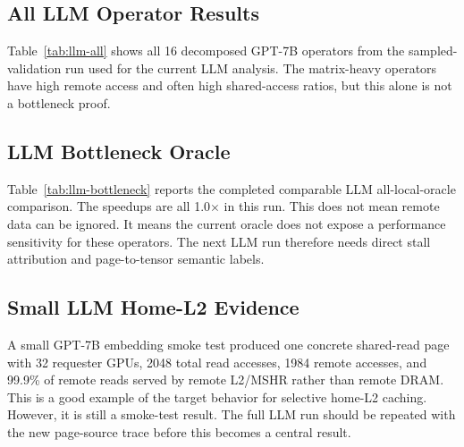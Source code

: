 \documentclass[sigconf,screen,review,anonymous]{acmart}
\begin{document}
\subsection{All LLM Operator Results}

Table~\ref{tab:llm-all} shows all 16 decomposed GPT-7B operators from the
sampled-validation run used for the current LLM analysis.  The matrix-heavy
operators have high remote access and often high shared-access ratios, but this
alone is not a bottleneck proof.

\begin{table}[t]
  \centering
  \caption{All decomposed GPT-7B operators in the current LLM analysis.  Time is
  driver total time in microseconds.}
  \label{tab:llm-all}
  \resizebox{\textwidth}{!}{}
\end{table}

\subsection{LLM Bottleneck Oracle}

Table~\ref{tab:llm-bottleneck} reports the completed comparable LLM
all-local-oracle comparison.  The speedups are all 1.0$\times$ in this run.
This does not mean remote data can be ignored.  It means the current oracle does
not expose a performance sensitivity for these operators.  The next LLM run
therefore needs direct stall attribution and page-to-tensor semantic labels.

\begin{table}[t]
  \centering
  \caption{LLM all-local data oracle comparison.  The current comparable run did
  not show speedup, despite high remote and shared-access ratios.}
  \label{tab:llm-bottleneck}
  \resizebox{\textwidth}{!}{}
\end{table}

\subsection{Small LLM Home-L2 Evidence}

A small GPT-7B embedding smoke test produced one concrete shared-read page with
32 requester GPUs, 2048 total read accesses, 1984 remote accesses, and 99.9\%
of remote reads served by remote L2/MSHR rather than remote DRAM.  This is a
good example of the target behavior for selective home-L2 caching.  However, it
is still a smoke-test result.  The full LLM run should be repeated with the new
page-source trace before this becomes a central result.
\end{document}
